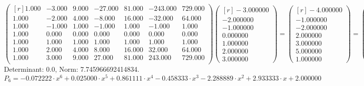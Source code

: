 \documentclass{report}[10pts]
\begin{document}
\[
      \begin{pmatrix*}[r]
         1.000 & -3.000 & 9.000 & -27.000 & 81.000 & -243.000 & 729.000\\
         1.000 & -2.000 & 4.000 & -8.000 & 16.000 & -32.000 & 64.000\\
         1.000 & -1.000 & 1.000 & -1.000 & 1.000 & -1.000 & 1.000\\
         1.000 & 0.000 & 0.000 & 0.000 & 0.000 & 0.000 & 0.000\\
         1.000 & 1.000 & 1.000 & 1.000 & 1.000 & 1.000 & 1.000\\
         1.000 & 2.000 & 4.000 & 8.000 & 16.000 & 32.000 & 64.000\\
         1.000 & 3.000 & 9.000 & 27.000 & 81.000 & 243.000 & 729.000\\
      \end{pmatrix*}
      \begin{pmatrix*}[r]
      -3.000000 \\ -2.000000 \\ -1.000000 \\ 0.000000 \\ 1.000000 \\ 2.000000 \\ 3.000000
      \end{pmatrix*}
   =
      \begin{pmatrix*}[r]
      -4.000000 \\ -1.000000 \\ -2.000000 \\ 2.000000 \\ 3.000000 \\ 5.000000 \\ 1.000000
      \end{pmatrix*}
   =
      \begin{pmatrix*}[r]
      -4.000000 \\ -1.000000 \\ -2.000000 \\ 2.000000 \\ 3.000000 \\ 5.000000 \\ 1.000000
      \end{pmatrix*}
\]
Determinant:
0.0,
Norm:
7.745966692414834.
\[
   P_{6}=
   -0.072222\cdot x^{6} +0.025000\cdot x^{5} +0.861111\cdot x^{4} -0.458333\cdot x^{3} -2.288889\cdot x^{2} +2.933333\cdot x +2.000000
\]
\end{document}
